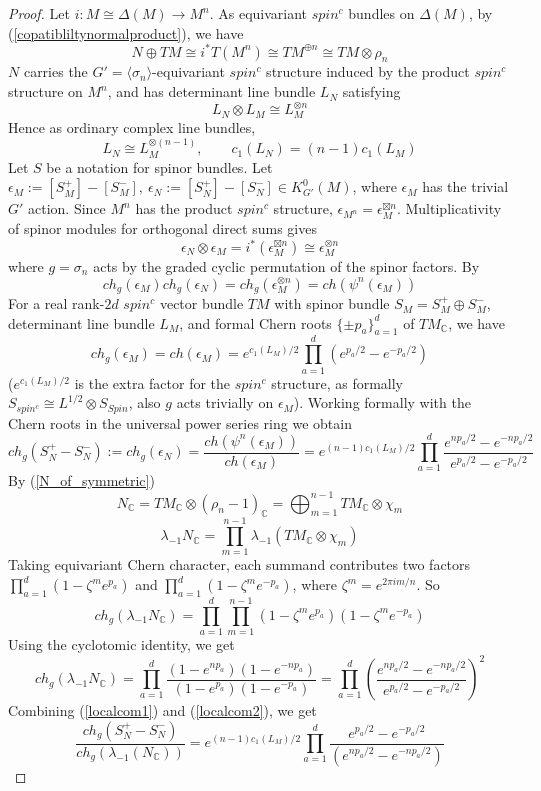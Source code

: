 \documentclass[11pt,leqno,twoside]{amsart}
\theoremstyle{plainsl}
\theoremstyle{definition}
\begin{document}
\begin{proof}
Let $i:M\cong \Delta(M) \rightarrow M^n$. As equivariant $spin^c$ bundles on $\Delta(M)$, by (\ref{copatibliltynormalproduct}), we have
\[
 N\oplus TM \cong i^*T(M^{ n})\cong TM^{\oplus n}  \cong TM\otimes \rho_n
\]
$N$ carries the \(G'=\langle\sigma_n\rangle\)-equivariant $spin^c$ structure induced by the product $spin^c$ structure on $M^n$, and has determinant line bundle $L_N$ satisfying
\[
L_N\otimes L_M \cong L_M^{\otimes n}
\]
Hence as ordinary complex line bundles,
\[
L_N\cong L_M^{\otimes (n-1)},
\qquad
c_1(L_N)=(n-1)c_1(L_M)
\]
Let $S$ be a notation for spinor bundles. Let $\epsilon_M:=[S^+_{M}]-[S_{M}^-],
\: \epsilon_N:=[S^+_N]-[S_N^-] \in K_{G'}^0(M)$, where $\epsilon_M$ has the trivial $G'$ action. Since $M^n$ has the product $spin^c$ structure, $\epsilon_{M^n}=\epsilon_M^{\boxtimes n}$.
Multiplicativity of spinor modules for orthogonal direct sums gives
\[ \epsilon_N \otimes  \epsilon_M =i^*(\epsilon_M^{\boxtimes n})\cong \epsilon_M^{\otimes n}\]
where $g=\sigma_n$ acts by the graded cyclic permutation of the spinor factors. By \cite{At}
\[ch_g(\epsilon_M)ch_g(\epsilon_N)=ch_g(\epsilon_M^{\otimes n})=ch(\psi^n(\epsilon_M))\]
For a real rank-$2d$ $spin^c$ vector bundle $TM$ with spinor bundle $S_M=S_M^+\oplus S^-_M$, determinant line bundle $L_M$, and formal Chern roots $\{\pm p_a\}^d_{a=1}$ of $TM_{\mathbb{C}}$,
we have \cite[p.~569]{AS3}
\[ch_g(\epsilon_M)=ch(\epsilon_M)=e^{c_1(L_M)/2}\prod^d_{a=1}(e^{p_a/2}-e^{-p_a/2})\]
($e^{c_1(L_M)/2}$ is the extra factor for the $spin^c$ structure, as formally $S_{spin^c}\cong L^{1/2}\otimes S_{Spin}$, also $g$ acts trivially on $\epsilon_M$). Working formally with the Chern roots in the universal
power series ring we obtain
\begin{equation}\label{localcom1}
 ch_g(S_N^+-S^-_N):=ch_g(\epsilon_N)=\frac{ch(\psi^n(\epsilon_M))}{ch(\epsilon_M)}   
=
e^{(n-1)c_1(L_M)/2}\prod_{a=1}^d
\frac{e^{np_a/2}-e^{-np_a/2}}{e^{p_a/2}-e^{-p_a/2}}
\end{equation}
By (\ref{N_of_symmetric})
\[N_{\mathbb{C}}=TM_{\mathbb{C}}\otimes(\rho_n-1)_{\mathbb{C}}=\bigoplus^{n-1}_{m=1} TM_{\mathbb{C}}\otimes\chi_m\]
\[\lambda_{-1}N_{\mathbb{C}}=\prod^{n-1}_{m=1} \lambda_{-1}(TM_{\mathbb{C}}\otimes\chi_m)\]
Taking equivariant Chern character, each summand contributes two factors $\prod^{d}_{a=1}(1-\zeta^me^{p_a})$ and $\prod^{d}_{a=1}(1-\zeta^me^{-p_a})$, where $\zeta^m=e^{2\pi im/n}$. So
\[ch_g(\lambda_{-1}N_{\mathbb{C}})=\prod^{d}_{a=1}\prod^{n-1}_{m=1} (1-\zeta^me^{p_a})(1-\zeta^me^{-p_a})\]
Using the cyclotomic identity, we get
\begin{equation}\label{localcom2}
    ch_g(\lambda_{-1}N_{\mathbb{C}})=\prod^{d}_{a=1}\frac{(1-e^{np_a})(1-e^{-np_a})}{(1-e^{p_a})(1-e^{-p_a})}=\prod^{d}_{a=1}(\frac{e^{np_a/2}-e^{-np_a/2}}{e^{p_a/2}-e^{-p_a/2}})^2
\end{equation}
Combining (\ref{localcom1}) and (\ref{localcom2}), we get
\[\frac{ch_g(S^{+}_N-S^{-}_N)}{ch_g(\lambda_{-1}(N_{\mathbb{C}}))}=e^{(n-1)c_1(L_M)/2}\prod^d_{a=1}  \frac{e^{p_a/2}-e^{-p_a/2}}{ (e^{np_a/2}-e^{-np_a/2})}\]
\end{proof}
\end{document}
